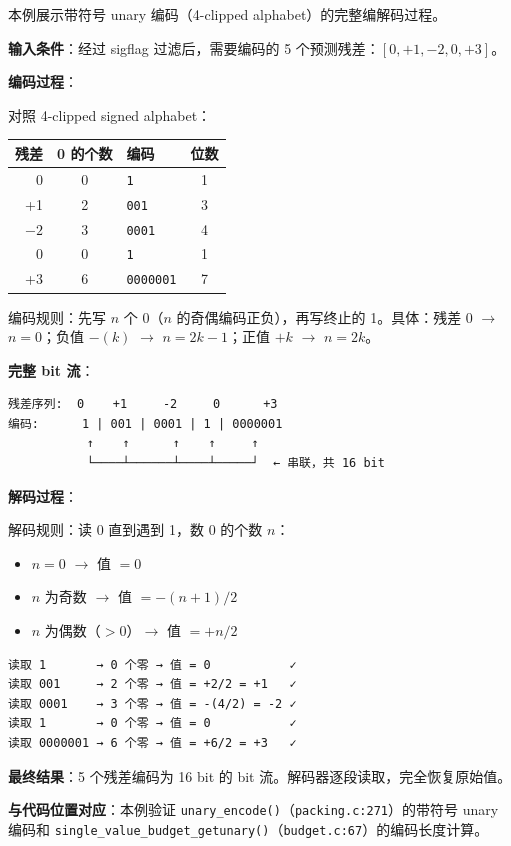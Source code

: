 \begin{examplebox}[title={例 2b：Unary 编码详细示例}]

本例展示带符号 unary 编码（4-clipped alphabet）的完整编解码过程。

\medskip
\textbf{输入条件}：经过 sigflag 过滤后，需要编码的 5 个预测残差：$[0, +1, -2, 0, +3]$。

\medskip
\textbf{编码过程}：

对照 4-clipped signed alphabet：

\begin{table}[H]
\centering
\begin{tabular}{@{}rclc@{}}
\toprule
残差 & 0 的个数 & 编码 & 位数 \\
\midrule
0 & 0 & \texttt{1} & 1 \\
+1 & 2 & \texttt{001} & 3 \\
$-2$ & 3 & \texttt{0001} & 4 \\
0 & 0 & \texttt{1} & 1 \\
+3 & 6 & \texttt{0000001} & 7 \\
\bottomrule
\end{tabular}
\end{table}

编码规则：先写 $n$ 个 0（$n$ 的奇偶编码正负），再写终止的 1。具体：残差 0 $\to$ $n=0$；负值 $-(k)$ $\to$ $n = 2k-1$；正值 $+k$ $\to$ $n = 2k$。

\textbf{完整 bit 流}：

\begin{lstlisting}[numbers=none]
残差序列:  0    +1     -2     0      +3
编码:      1 | 001 | 0001 | 1 | 0000001
           ↑    ↑      ↑    ↑     ↑
           └────┴──────┴────┴─────┘  ← 串联，共 16 bit
\end{lstlisting}

\textbf{解码过程}：

解码规则：读 0 直到遇到 1，数 0 的个数 $n$：
\begin{itemize}
  \item $n = 0$ $\to$ 值 $= 0$
  \item $n$ 为奇数 $\to$ 值 $= -(n+1)/2$
  \item $n$ 为偶数（$>0$）$\to$ 值 $= +n/2$
\end{itemize}

\begin{lstlisting}[numbers=none]
读取 1       → 0 个零 → 值 = 0           ✓
读取 001     → 2 个零 → 值 = +2/2 = +1   ✓
读取 0001    → 3 个零 → 值 = -(4/2) = -2 ✓
读取 1       → 0 个零 → 值 = 0           ✓
读取 0000001 → 6 个零 → 值 = +6/2 = +3   ✓
\end{lstlisting}

\medskip
\textbf{最终结果}：5 个残差编码为 16 bit 的 bit 流。解码器逐段读取，完全恢复原始值。

\medskip
\textbf{与代码位置对应}：本例验证 \texttt{unary\_encode()}（\texttt{packing.c:271}）的带符号 unary 编码和 \texttt{single\_value\_budget\_getunary()}（\texttt{budget.c:67}）的编码长度计算。
\end{examplebox}

